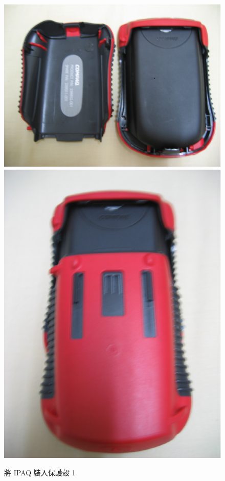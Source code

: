 \documentclass[12pt,a4paper]{article}
\begin{document}
\begin{CJK}{UTF8}{cwmu}
\begin{figure}[htbp]
\centering
\includegraphics[scale=0.3]{eps/shell_3.eps}%
\hspace{0.5cm}%
\includegraphics[scale=0.3]{eps/shell_4.eps}
\caption{將 IPAQ 裝入保護殼 1}
\end{figure}



\end{CJK}
\end{document}
